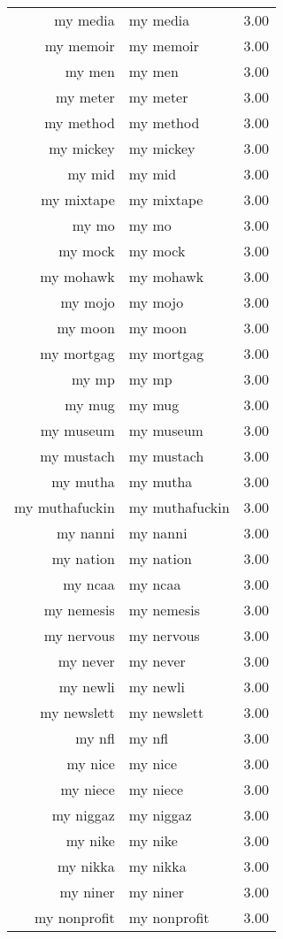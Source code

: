 \begin{table}[ht]
\begin{tabular}{rlr}
  my media & my media & 3.00 \\ 
  my memoir & my memoir & 3.00 \\ 
  my men & my men & 3.00 \\ 
  my meter & my meter & 3.00 \\ 
  my method & my method & 3.00 \\ 
  my mickey & my mickey & 3.00 \\ 
  my mid & my mid & 3.00 \\ 
  my mixtape & my mixtape & 3.00 \\ 
  my mo & my mo & 3.00 \\ 
  my mock & my mock & 3.00 \\ 
  my mohawk & my mohawk & 3.00 \\ 
  my mojo & my mojo & 3.00 \\ 
  my moon & my moon & 3.00 \\ 
  my mortgag & my mortgag & 3.00 \\ 
  my mp & my mp & 3.00 \\ 
  my mug & my mug & 3.00 \\ 
  my museum & my museum & 3.00 \\ 
  my mustach & my mustach & 3.00 \\ 
  my mutha & my mutha & 3.00 \\ 
  my muthafuckin & my muthafuckin & 3.00 \\ 
  my nanni & my nanni & 3.00 \\ 
  my nation & my nation & 3.00 \\ 
  my ncaa & my ncaa & 3.00 \\ 
  my nemesis & my nemesis & 3.00 \\ 
  my nervous & my nervous & 3.00 \\ 
  my never & my never & 3.00 \\ 
  my newli & my newli & 3.00 \\ 
  my newslett & my newslett & 3.00 \\ 
  my nfl & my nfl & 3.00 \\ 
  my nice & my nice & 3.00 \\ 
  my niece & my niece & 3.00 \\ 
  my niggaz & my niggaz & 3.00 \\ 
  my nike & my nike & 3.00 \\ 
  my nikka & my nikka & 3.00 \\ 
  my niner & my niner & 3.00 \\ 
  my nonprofit & my nonprofit & 3.00 \\ 

\end{tabular}
\end{table}
